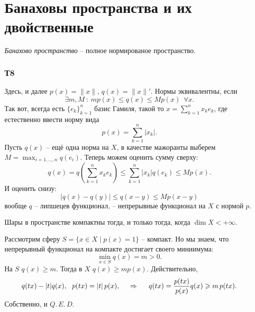\section{Банаховы пространства и их двойственные}


\begin{to_def}
    \textit{Банахово пространство} -- полное нормированое пространство. 
\end{to_def}





\subsubsection*{Т8}

Здесь, и далее $p(x) = \|x\|$, $q(x) = \|x\|'$. Нормы эквивалентны, если
\begin{equation*}
    \exists m, M \ \colon  \ m p(x) \leq q(x) \leq M p(x) \  \ \forall x.
\end{equation*}
Так вот, всегда есть $\{e_k\}_{k=1}^n$ базис Гамиля, такой то $x = \sum_{k=1}^n x_k e_k$, где естественно ввести норму вида
\begin{equation*}
    p(x) = \sum_{k=1}^n |x_k|.
\end{equation*}
Пусть $q(x)$ -- ещё одна норма на $X$, в качестве мажоранты выберем $M = \max_{i=1, \ldots, n}  q(e_i)$.
Теперь можем оценить сумму сверху:
\begin{equation*}
    q(x) = q\left(
        \sum_{k=1}^n x_k e_k
    \right) \leq \sum_{k=1}^{n} |x_k| q(e_k) \leq M p(x).
\end{equation*}
И оценить снизу:
\begin{equation*}
    |q(x) - q(y)| \leq q(x-y) \leq M p (x-y)
\end{equation*}
вообще $q$ -- липшецев функционал, -- непрерывные функционал на $X$ с нормой $p$. 


\begin{to_lem}
    Шары в пространстве компактны тогда, и только тогда, когда $\dim X < + \infty$.
\end{to_lem}

Рассмотрим сферу $S = \{x \in X \mid p(x) = 1\}$ -- компакт. Но мы знаем, что непрерывный функционал на компакте достигает своего миниимума:
\begin{equation*}
    \min_{x \in S} q(x) = m > 0.
\end{equation*}
На $S$ $q(x) \geq m$. Тогда в $X$ $q(x) \geq m p(x)$. Действительно,
\begin{equation*}
    q(tx) - |t|q(x), \ \  p(tx) = |t| \, p(x), \hspace{0.5cm} \Rightarrow \hspace{0.5cm}
    q(tx) = \frac{p(tx)}{p(x)} q(x) \geq m\, p(tx).
\end{equation*}
Собственно, и $Q.\, E.\, D.$






